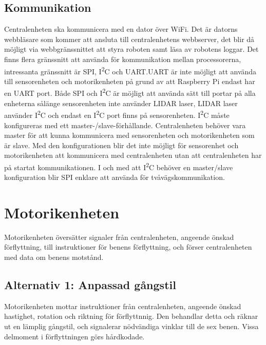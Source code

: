\documentclass[a4paper,titlepage,12pt]{article}
\newcommand{\itc}{I\textsuperscript{2}C}
\begin{document}
	\subsection{Kommunikation}
	Centralenheten ska kommunicera med en dator över WiFi. Det är datorns webbläsare 
	som kommer att ansluta till centralenhetens webbserver, det blir då möjligt
    via webbgränssnittet att styra roboten samt läsa av robotens loggar. Det finns
    flera gränssnitt att 
	använda för kommunikation mellan processorerna, intressanta gränssnitt är SPI, 
	\itc{} och UART.\@ UART är inte möjligt att använda till sensorenheten och 
	motorikenheten på grund av att Raspberry Pi endast har en UART port. Både 
	SPI och \itc{} är möjligt att använda sätt till portar på alla enheterna sålänge 
	sensorenheten inte använder LIDAR laser, LIDAR laser använder \itc{} och endast en 
	\itc{} port finns på sensorenheten. \itc{} måste konfigureras med ett
    master-/slave-förhållande. Centralenheten behöver vara master för att kunna
    kommunicera med 
	sensorenheten och motorikenheten som är slave. Med den konfigurationen blir 
	det inte möjligt för sensorenhet och motorikenheten att kommunicera med
	centralenheten utan att centralenheten har på startat kommunikationen. I och 
	med att \itc{} behöver en master/slave konfiguration blir SPI enklare att använda 
	för tvåvägskommunikation. 



	
	\section{Motorikenheten}
    	Motorikenheten översätter signaler från centralenheten, angeende önskad förflyttning, 
    	till instruktioner för benens förflyttning, och förser centralenheten med data om
    	benens motstånd.
    
    	\subsection{Alternativ 1: Anpassad gångstil}
    	Motorikenheten mottar instruktioner från centralenheten, angeende önskad hastighet, 
    	rotation och riktning för förflyttnnig. Den behandlar detta och räknar ut en lämplig 
	gångstil, och signalerar nödvändiga vinklar till de sex benen. Vissa delmoment i 
	förflyttningen görs hårdkodade. 
    
\end{document}
